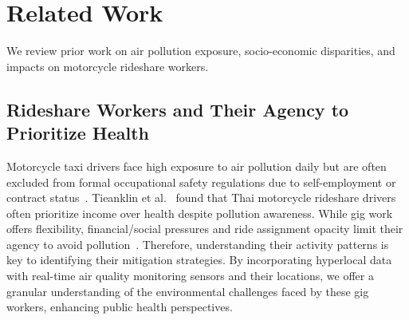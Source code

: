 \section{Related Work}
We review prior work on air pollution exposure, socio-economic disparities, and impacts on motorcycle rideshare workers.

\subsection{Rideshare Workers and Their Agency to Prioritize Health}



Motorcycle taxi drivers face high exposure to air pollution daily but are often excluded from formal occupational safety regulations due to self-employment or contract status~\cite{slater2022air}. 
Tieanklin et al.~\cite{tieanklin2024rideshare} found that Thai motorcycle rideshare drivers often prioritize income over health despite pollution awareness.
While gig work offers flexibility, financial/social pressures and ride assignment opacity limit their agency to avoid pollution~\cite{machado2021midlife,elfassy2019associations}.
Therefore, understanding their activity patterns is key to identifying their mitigation strategies. 
By incorporating hyperlocal data with real-time air quality monitoring sensors and their locations, we offer a granular understanding of the environmental challenges faced by these gig workers, enhancing public health perspectives.


